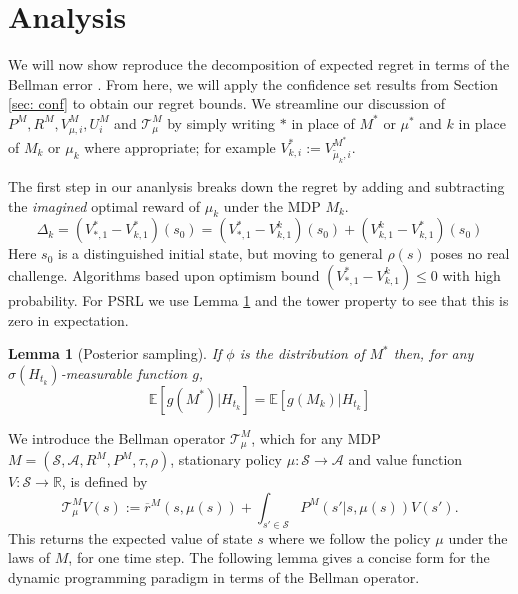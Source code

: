 \documentclass{article}
\newtheorem{lemma}{Lemma}
\newcommand{\Exp}{\mathds{E}}
\newcommand{\Sc}{\mathcal{S}}
\newcommand{\Ac}{\mathcal{A}}
\newcommand{\Tc}{\mathcal{T}}
\begin{document}
\section{Analysis}
We will now show reproduce the decomposition of expected regret in terms of the Bellman error \cite{osband2013more}.
From here, we will apply the confidence set results from Section \ref{sec: conf} to obtain our regret bounds.
We streamline our discussion of $P^{M}, R^{M}, V^{M}_{\mu,i}, U^{M}_{i}$ and $\Tc^M_\mu$ by simply writing $*$ in place of $M^*$ or $\mu^*$ and $k$ in place of $M_k$ or $\mu_k$ where appropriate; for example $V^*_{k,i} := V^{M^*}_{\tilde{\mu}_k,i}$.

The first step in our ananlysis breaks down the regret by adding and subtracting the \emph{imagined} optimal reward of $\mu_k$ under the MDP $M_k$.
\begin{equation}
	\Delta_k = \left( V^*_{*,1} - V^*_{k,1} \right)(s_0)
	= \left( V^*_{*,1} - V^k_{k,1} \right)(s_0) + \left( V^k_{k,1} - V^*_{k,1} \right)(s_0)
\end{equation}
Here $s_0$ is a distinguished initial state, but moving to general $\rho(s)$ poses no real challenge.
Algorithms based upon optimism bound $( V^*_{*,1} - V^k_{k,1} ) \le 0$ with high probability.
For PSRL we use Lemma \ref{lem: ps} and the tower property to see that this is zero in expectation.
\begin{lemma}[Posterior sampling]
\label{lem: ps}
\hspace{0.00000000000001mm} \newline
If $\phi$ is the distribution of $M^*$ then, for any $\sigma(H_{t_k})$-measurable function $g$,
\begin{equation}
\label{eq: ps}
	\Exp [g(M^*) | H_{t_k} ] = \Exp [g(M_k) | H_{t_k} ]
\end{equation}
\end{lemma}

We introduce the Bellman operator $\mathcal{T}_{\mu}^{M}$, which for any MDP $M = (\Sc, \Ac, R^M, P^M, \tau, \rho)$, stationary policy $\mu:\Sc \rightarrow \Ac$ and value function $V:\Sc \rightarrow \mathds{R}$, is defined by
$$\mathcal{T}_{\mu}^{M} V(s) := \overline{r}^{M} (s, \mu(s)) + \int_{s' \in \Sc} P^{M}(s' | s, \mu(s)) V(s').$$
This returns the expected value of state $s$ where we follow the policy $\mu$ under the laws of $M$, for one time step.
The following lemma gives a concise form for the dynamic programming paradigm in terms of the Bellman operator.
\end{document}
